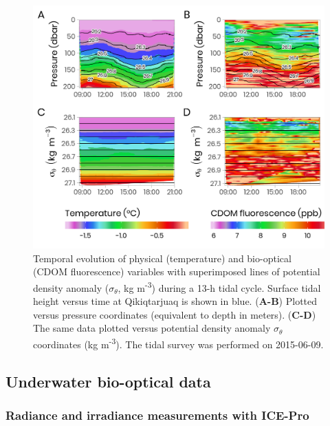 \documentclass[essd, manuscript]{copernicus}
\begin{document}
\begin{figure}[H]
	\centering
	\includegraphics[scale = 1]{../../../graphs/fig04.png}
	\caption{Temporal evolution of physical (temperature) and bio-optical (CDOM fluorescence) variables with superimposed lines of potential density anomaly ($\sigma_\theta$, kg m\textsuperscript{-3}) during a 13-h tidal cycle. Surface tidal height versus time at Qikiqtarjuaq is shown in blue. (\textbf{A-B}) Plotted versus pressure coordinates (equivalent to depth in meters). (\textbf{C-D}) The same data plotted versus potential density anomaly $\sigma_\theta$ coordinates (kg m\textsuperscript{-3}). The tidal survey was performed on 2015-06-09.}
\end{figure}

\subsection{Underwater bio-optical data}

\subsubsection{Radiance and irradiance measurements with ICE-Pro}
\end{document}
